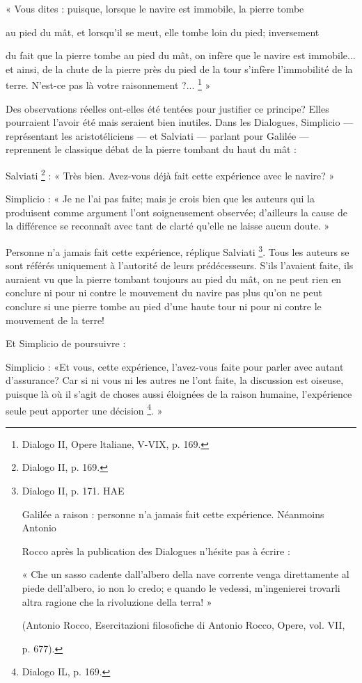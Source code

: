 « Vous dites : puisque, lorsque le navire est immobile, la pierre tombe

 au pied du mât, et lorsqu'il se meut, elle tombe loin du pied; inversement

du fait que la pierre tombe au pied du mât, on infère que le navire est
immobile... et ainsi, de la chute de la pierre près du pied de la tour
s’infère l’immobilité de la terre. N’est-ce pas là votre raisonnement ?... \footnote{Dialogo II, Opere ltaliane, V-VIX, p. 169.} »

Des observations réelles ont-elles été tentées pour justifier ce principe?
Elles pourraient l’avoir été mais seraient bien inutiles. Dans les Dialogues,
Simplicio — représentant les aristotéliciens — et Salviati — parlant
pour Galilée — reprennent le classique débat de la pierre tombant du
haut du mât :

Salviati \footnote{Dialogo II, p. 169.} : « Très bien. Avez-vous déjà fait cette expérience avec le
navire? »

Simplicio : « Je ne l’ai pas faite; mais je crois bien que les auteurs
qui la produisent comme argument l’ont soigneusement observée;
d’ailleurs la cause de la différence se reconnaît avec tant de clarté qu’elle
ne laisse aucun doute. »

Personne n’a jamais fait cette expérience, réplique Salviati \footnote{Dialogo II, p. 171. HAE

Galilée a raison : personne n’a jamais fait cette expérience. Néanmoins Antonio

Rocco après la publication des Dialogues n’hésite pas à écrire :

« Che un sasso cadente dall’albero della nave corrente venga direttamente al piede
dell’albero, io non lo credo; e quando le vedessi, m’ingenierei trovarli altra ragione
che la rivoluzione della terra! »

(Antonio Rocco, Esercitazioni filosofiche di Antonio Rocco, Opere, vol. VII,

p. 677).}. Tous
les auteurs se sont référés uniquement à l’autorité de leurs prédécesseurs.
S’ils l'avaient faite, ils auraient vu que la pierre tombant toujours au
pied du mât, on ne peut rien en conclure ni pour ni contre le mouvement
du navire pas plus qu’on ne peut conclure si une pierre tombe au pied
d’une haute tour ni pour ni contre le mouvement de la terre!

Et Simplicio de poursuivre :

Simplicio : «Et vous, cette expérience, l’avez-vous faite pour parler
avec autant d’assurance? Car si ni vous ni les autres ne l’ont faite, la
discussion est oiseuse, puisque là où il s’agit de choses aussi éloignées
de la raison humaine, l’expérience seule peut apporter une décision \footnote{Dialogo IL, p. 169.}. »

